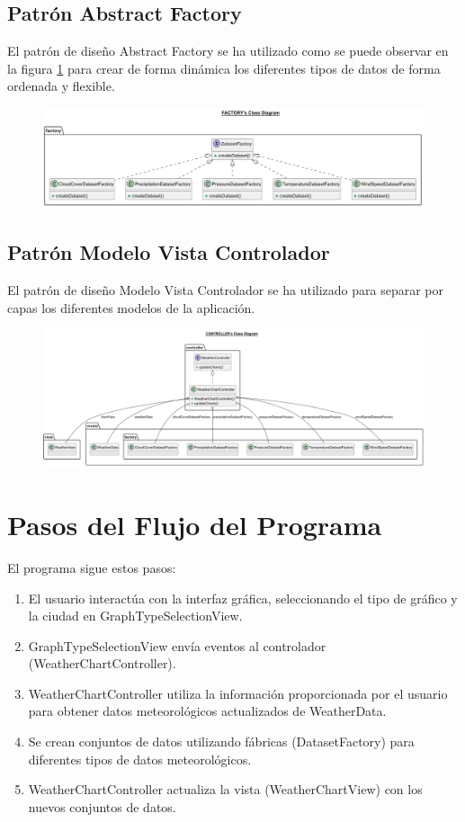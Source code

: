 \documentclass{article}
\begin{document}
\subsection{Patrón Abstract Factory}
El patrón de diseño Abstract Factory se ha utilizado como se puede observar en la figura \ref{fig:image7} para crear de forma dinámica los diferentes tipos de datos de forma ordenada y flexible.

\begin{figure}[H]
  \centering
  \includegraphics[width=1.1\textwidth]{images/image7.png}
  \label{fig:image7}
\end{figure}

\subsection{Patrón Modelo Vista Controlador}
El patrón de diseño Modelo Vista Controlador se ha utilizado para separar por capas los diferentes modelos de la aplicación.

\begin{figure}[H]
  \centering
  \includegraphics[width=1.1\textwidth]{images/image3.png}
  \label{fig:image3}
\end{figure}

\section{Pasos del Flujo del Programa}
El programa sigue estos pasos:

\begin{enumerate}
  \item El usuario interactúa con la interfaz gráfica, seleccionando el tipo de gráfico y la ciudad en GraphTypeSelectionView.
  \item GraphTypeSelectionView envía eventos al controlador (WeatherChartController).
  \item WeatherChartController utiliza la información proporcionada por el usuario para obtener datos meteorológicos actualizados de WeatherData.
  \item Se crean conjuntos de datos utilizando fábricas (DatasetFactory) para diferentes tipos de datos meteorológicos.
  \item WeatherChartController actualiza la vista (WeatherChartView) con los nuevos conjuntos de datos.
\end{enumerate}
\end{document}
